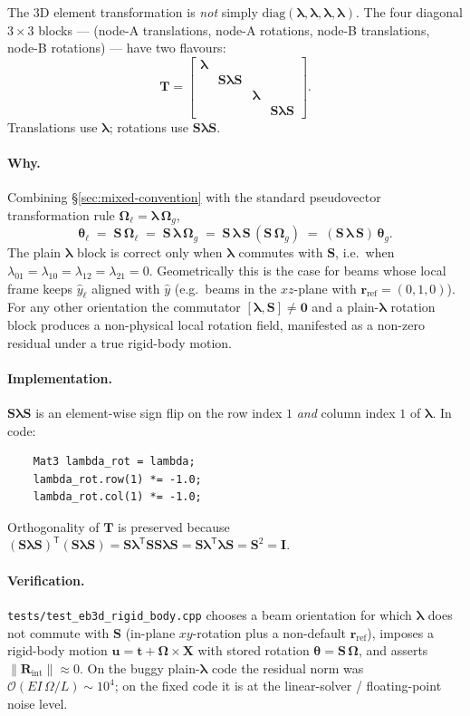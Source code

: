 \documentclass[11pt,a4paper]{book}
\newcommand{\bmath}[1]{\boldsymbol{#1}}
\newcommand{\yhat}{\hat{y}}
\newcommand{\yhatl}{\hat{y}_\ell}
\newcommand{\Sdiag}{\bmath{S}}
\newcommand{\lam}{\bmath{\lambda}}
\begin{document}
The 3D element transformation is \emph{not} simply $\mathrm{diag}(\lam, \lam, \lam, \lam)$. The four diagonal $3\times 3$ blocks --- (node-A translations, node-A rotations, node-B translations, node-B rotations) --- have two flavours:
\[
\boxed{\;\bmath{T} = \begin{bmatrix} \lam & & & \\ & \Sdiag\lam\Sdiag & & \\ & & \lam & \\ & & & \Sdiag\lam\Sdiag \end{bmatrix}.\;}
\]
Translations use $\lam$; rotations use $\Sdiag\lam\Sdiag$.

\paragraph{Why.} Combining \S\ref{sec:mixed-convention} with the standard pseudovector transformation rule $\bmath{\Omega}_\ell = \lam\,\bmath{\Omega}_g$,
\[
\bmath{\theta}_\ell \;=\; \Sdiag\,\bmath{\Omega}_\ell \;=\; \Sdiag\,\lam\,\bmath{\Omega}_g \;=\; \Sdiag\,\lam\,\Sdiag\,(\Sdiag\,\bmath{\Omega}_g) \;=\; (\Sdiag\,\lam\,\Sdiag)\,\bmath{\theta}_g.
\]
The plain $\lam$ block is correct only when $\lam$ commutes with $\Sdiag$, i.e.\ when $\lambda_{01} = \lambda_{10} = \lambda_{12} = \lambda_{21} = 0$. Geometrically this is the case for beams whose local frame keeps $\yhatl$ aligned with $\yhat$ (e.g.\ beams in the $xz$-plane with $\bmath{r}_{\text{ref}}=(0,1,0)$). For any other orientation the commutator $[\lam, \Sdiag] \ne \bmath{0}$ and a plain-$\lam$ rotation block produces a non-physical local rotation field, manifested as a non-zero residual under a true rigid-body motion.

\paragraph{Implementation.} $\Sdiag\lam\Sdiag$ is an element-wise sign flip on the row index $1$ \emph{and} column index $1$ of $\lam$. In code:
\begin{verbatim}
    Mat3 lambda_rot = lambda;
    lambda_rot.row(1) *= -1.0;
    lambda_rot.col(1) *= -1.0;
\end{verbatim}
Orthogonality of $\bmath{T}$ is preserved because $(\Sdiag\lam\Sdiag)^\mathsf{T}(\Sdiag\lam\Sdiag) = \Sdiag\lam^\mathsf{T}\Sdiag\Sdiag\lam\Sdiag = \Sdiag\lam^\mathsf{T}\lam\Sdiag = \Sdiag^2 = \bmath{I}$.

\paragraph{Verification.} \texttt{tests/test\_eb3d\_rigid\_body.cpp} chooses a beam orientation for which $\lam$ does not commute with $\Sdiag$ (in-plane $xy$-rotation plus a non-default $\bmath{r}_{\text{ref}}$), imposes a rigid-body motion $\bmath{u} = \bmath{t} + \bmath{\Omega}\times\bmath{X}$ with stored rotation $\bmath{\theta} = \Sdiag\,\bmath{\Omega}$, and asserts $\|\bmath{R}_{\mathrm{int}}\| \approx 0$. On the buggy plain-$\lam$ code the residual norm was $\mathcal{O}(EI\,\Omega / L) \sim 10^4$; on the fixed code it is at the linear-solver / floating-point noise level.
\end{document}
